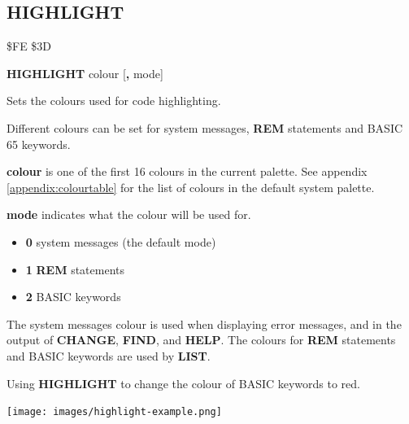 \subsection{HIGHLIGHT}
\begin{description}[leftmargin=2cm,style=nextline]
\item [Token:] \$FE \$3D
\item [Format:] {\bf HIGHLIGHT} colour [{\bf,} mode]
\item [Usage:] Sets the colours used for code highlighting.

                Different colours can be
                set for system messages, {\bf REM} statements and BASIC 65 keywords.

                {\bf colour} is one of the first 16 colours in the current palette.
                See appendix \vref{appendix:colourtable}
                for the list of colours in the default system palette.

                {\bf mode} indicates what the colour will be used for.
                \begin{itemize}
                    \item {\bf 0} system messages (the default mode)
                    \item {\bf 1} {\bf REM} statements
                    \item {\bf 2} BASIC keywords
                \end{itemize}

\item [Remarks:] The system messages colour is used when displaying error
                messages, and in the output of {\bf CHANGE}, {\bf FIND}, and
                {\bf HELP}. The colours for {\bf REM} statements and BASIC keywords
                are used by {\bf LIST}.
\item [Example:] Using {\bf HIGHLIGHT} to change the colour of BASIC keywords to red.
\item \begin{center}\texttt{[image: images/highlight-example.png]}\end{center}
\end{description}


\newpage
